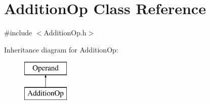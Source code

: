\hypertarget{class_addition_op}{\section{Addition\+Op Class Reference}
\label{class_addition_op}
}


{\ttfamily \#include $<$Addition\+Op.\+h$>$}

Inheritance diagram for Addition\+Op\+:\begin{figure}[H]
\begin{center}
\leavevmode
\includegraphics[height=2.000000cm]{class_addition_op}
\end{center}
\end{figure}
